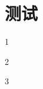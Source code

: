 \documentclass{tingtao-math}
\begin{document}
\tableofcontents

\section{测试}

\begin{choices}
  \item 1
  \item 2
  \item 3
\end{choices}
\end{document}
